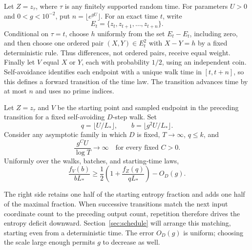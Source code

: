 Let \(Z=z_\tau\), where \(\tau\) is any finitely supported random time.
For parameters \(U>0\) and \(0<g<10^{-2}\), put
\(n=\lfloor e^{gU}\rfloor\). For an exact time \(t\), write
\[
 E_t=\{z_t,z_{t+1},\ldots,z_{t+n}\}.
\]
Conditional on \(\tau=t\), choose \(h\) uniformly from the set
\(E_t-E_t\), including zero, and then choose one ordered pair
\((X,Y)\in E_t^2\) with \(X-Y=h\) by a fixed deterministic rule.
Thus differences, not ordered pairs, receive equal weight.
Finally let \(V\) equal \(X\) or \(Y\), each with probability
\(1/2\), using an independent coin. Self-avoidance identifies each
endpoint with a unique walk time in \([t,t+n]\), so this defines a
forward transition of the time law. The transition advances time by
at most \(n\) and uses no prime indices.

\begin{lemma}\label{lem:enrichment}
Let \(Z=z_\tau\) and \(V\) be the starting point and sampled endpoint
in the preceding transition for a fixed self-avoiding \(D\)-step walk.
Set
\[
 q=\lfloor U/L_*\rfloor,\qquad b=\lfloor g^2U/L_*\rfloor.
\]
Consider any asymptotic family in which \(D\) is fixed,
\(T\to\infty\), \(q\le k\), and
\[
 \frac{g^C U}{\log T}\longrightarrow\infty
 \quad\text{for every fixed }C>0.
\]
Uniformly over the walks, batches, and starting-time laws,
\begin{equation}\label{eq:enrichment}
 \frac{f_V(b)}{bL_*}
 \ge \frac12\left(1+\frac{f_Z(q)}{qL_*}\right)-O_D(g).
\end{equation}
\end{lemma}

The right side retains one half of the starting entropy fraction and
adds one half of the maximal fraction. When successive transitions match
the next input coordinate count to the preceding output count, repetition
therefore drives the entropy deficit downward. Section~\ref{sec:schedule}
will arrange this matching, starting even from a deterministic time.
The error \(O_D(g)\) is uniform; choosing the scale large enough permits
\(g\) to decrease as well.


